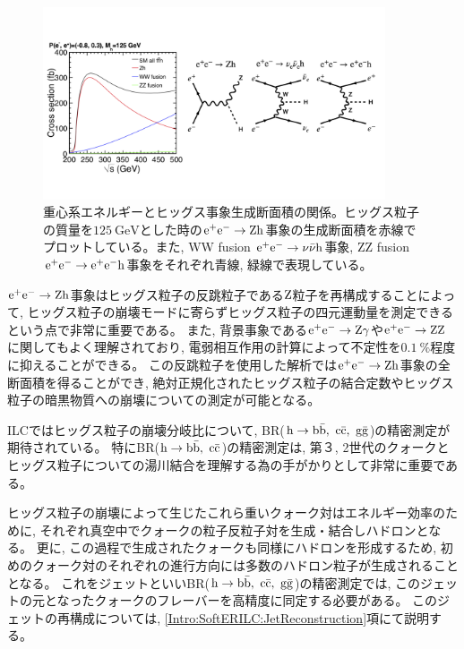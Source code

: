 \begin{figure}[htbp]
 \centering
 \includegraphics[trim= 0 50 0 50, width=0.9\textwidth, clip]{Figure/1Introduction/4eetoZH.png}
 \caption[重心系エネルギーとヒッグス事象生成断面積の関係]{重心系エネルギーとヒッグス事象生成断面積の関係\cite{ILCTDRVP}。ヒッグス粒子の質量を$125\ \mathrm{GeV}$とした時の$\rm e^+e^- \to Zh$事象の生成断面積を赤線でプロットしている。また, WW fusion $\rm e^+e^- \to \nu \bar{\nu} h$事象, ZZ fusion $\rm e^+e^- \to e^+ e^- h$事象をそれぞれ青線, 緑線で表現している。}
 \label{4eetoZH}
\end{figure}

$\rm e^+e^- \to Zh$事象はヒッグス粒子の反跳粒子である$\rm Z$粒子を再構成することによって, ヒッグス粒子の崩壊モードに寄らずヒッグス粒子の四元運動量を測定できるという点で非常に重要である。
また, 背景事象である$\rm e^+e^- \to Z\gamma$や$\rm e^+e^- \to ZZ$に関してもよく理解されており, 電弱相互作用の計算によって不定性を$0.1\ \%$程度に抑えることができる\cite{GlobalProject}。
この反跳粒子を使用した解析では$\rm e^+e^- \to Zh$事象の全断面積を得ることができ, 絶対正規化されたヒッグス粒子の結合定数やヒッグス粒子の暗黒物質への崩壊についての測定が可能となる。

ILCではヒッグス粒子の崩壊分岐比について, BR($\rm h \to b \bar{b},\ c \bar{c},\ g \bar{g}$)の精密測定が期待されている。
特にBR($\rm h \to b \bar{b},\ c \bar{c}$)の精密測定は, 第３, 2世代のクォークとヒッグス粒子についての湯川結合を理解する為の手がかりとして非常に重要である。

ヒッグス粒子の崩壊によって生じたこれら重いクォーク対はエネルギー効率のために, それぞれ真空中でクォークの粒子反粒子対を生成・結合しハドロンとなる。
更に, この過程で生成されたクォークも同様にハドロンを形成するため, 初めのクォーク対のそれぞれの進行方向には多数のハドロン粒子が生成されることとなる。
これをジェットといいBR($\rm h \to b \bar{b},\ c \bar{c},\ g \bar{g}$)の精密測定では, このジェットの元となったクォークのフレーバーを高精度に同定する必要がある。
このジェットの再構成については, \ref{Intro:SoftERILC:JetReconstruction}項にて説明する。


